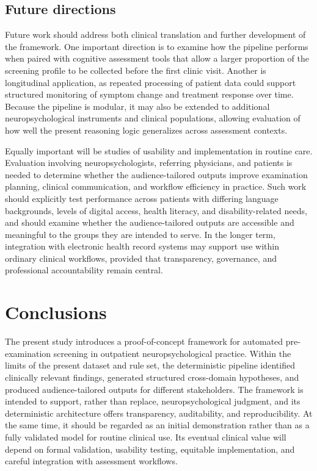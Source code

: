 \documentclass[11pt,a4paper]{article}
\begin{document}
\subsection{Future directions}

Future work should address both clinical translation and further development of the framework. One important direction is to examine how the pipeline performs when paired with cognitive assessment tools that allow a larger proportion of the screening profile to be collected before the first clinic visit. Another is longitudinal application, as repeated processing of patient data could support structured monitoring of symptom change and treatment response over time. Because the pipeline is modular, it may also be extended to additional neuropsychological instruments and clinical populations, allowing evaluation of how well the present reasoning logic generalizes across assessment contexts.

Equally important will be studies of usability and implementation in routine care. Evaluation involving neuropsychologists, referring physicians, and patients is needed to determine whether the audience-tailored outputs improve examination planning, clinical communication, and workflow efficiency in practice. Such work should explicitly test performance across patients with differing language backgrounds, levels of digital access, health literacy, and disability-related needs, and should examine whether the audience-tailored outputs are accessible and meaningful to the groups they are intended to serve. In the longer term, integration with electronic health record systems may support use within ordinary clinical workflows, provided that transparency, governance, and professional accountability remain central.


\section{Conclusions}
\label{sec:conclusion}

The present study introduces a proof-of-concept framework for automated pre-examination screening in outpatient neuropsychological practice. Within the limits of the present dataset and rule set, the deterministic pipeline identified clinically relevant findings, generated structured cross-domain hypotheses, and produced audience-tailored outputs for different stakeholders. The framework is intended to support, rather than replace, neuropsychological judgment, and its deterministic architecture offers transparency, auditability, and reproducibility. At the same time, it should be regarded as an initial demonstration rather than as a fully validated model for routine clinical use. Its eventual clinical value will depend on formal validation, usability testing, equitable implementation, and careful integration with assessment workflows.
\end{document}
